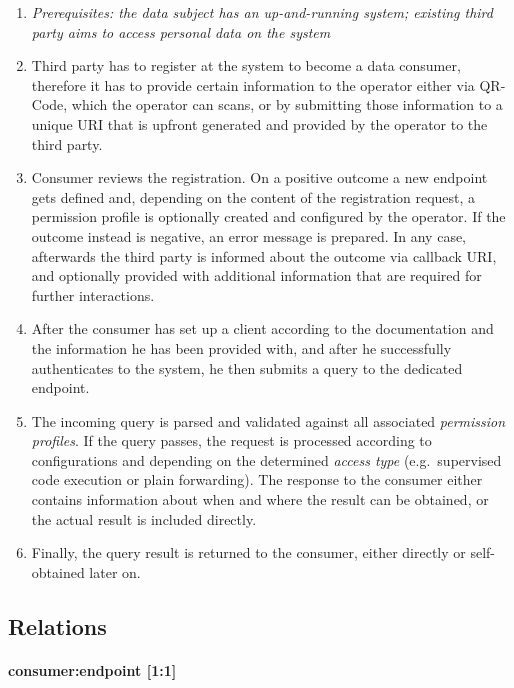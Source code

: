 \documentclass[12pt,english,a4paper,titlepage,cleardoublepage=empty,dottedtoc]{report}
\begin{document}
\begin{enumerate}
\def\labelenumi{\arabic{enumi}.}
\setcounter{enumi}{-1}
\item
  \emph{Prerequisites: the data subject has an up-and-running system;
  existing third party aims to access personal data on the system}
\item
  Third party has to register at the system to become a data consumer,
  therefore it has to provide certain information to the operator either
  via QR-Code, which the operator can scans, or by submitting those
  information to a unique URI that is upfront generated and provided by
  the operator to the third party.
\item
  Consumer reviews the registration. On a positive outcome a new
  endpoint gets defined and, depending on the content of the
  registration request, a permission profile is optionally created and
  configured by the operator. If the outcome instead is negative, an
  error message is prepared. In any case, afterwards the third party is
  informed about the outcome via callback URI, and optionally provided
  with additional information that are required for further
  interactions.
\item
  After the consumer has set up a client according to the documentation
  and the information he has been provided with, and after he
  successfully authenticates to the system, he then submits a query to
  the dedicated endpoint.
\item
  The incoming query is parsed and validated against all associated
  \emph{permission profiles}. If the query passes, the request is
  processed according to configurations and depending on the determined
  \emph{access type} (e.g.~supervised code execution or plain
  forwarding). The response to the consumer either contains information
  about when and where the result can be obtained, or the actual result
  is included directly.
\item
  Finally, the query result is returned to the consumer, either directly
  or self-obtained later on.
\end{enumerate}

\subsection*{Relations}\label{relations}

\paragraph{consumer:endpoint {[}1:1{]}}\label{consumerendpoint-11}
\end{document}
